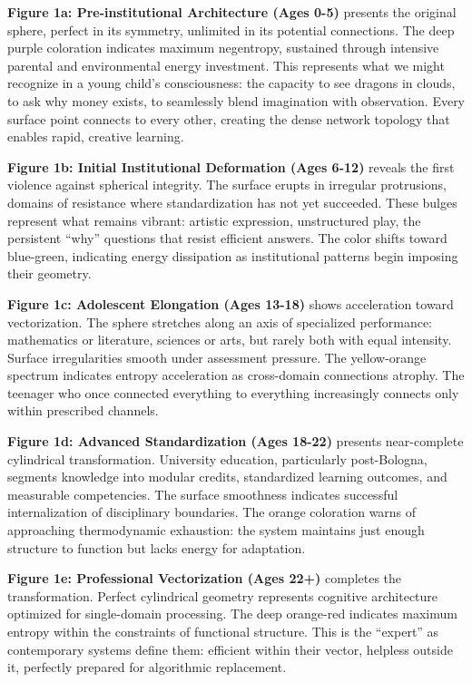 \textbf{Figure 1a: Pre-institutional Architecture (Ages 0-5)} presents the original sphere, perfect in its symmetry, unlimited in its potential connections. The deep purple coloration indicates maximum negentropy, sustained through intensive parental and environmental energy investment. This represents what we might recognize in a young child's consciousness: the capacity to see dragons in clouds, to ask why money exists, to seamlessly blend imagination with observation. Every surface point connects to every other, creating the dense network topology that enables rapid, creative learning.

\textbf{Figure 1b: Initial Institutional Deformation (Ages 6-12)} reveals the first violence against spherical integrity. The surface erupts in irregular protrusions, domains of resistance where standardization has not yet succeeded. These bulges represent what remains vibrant: artistic expression, unstructured play, the persistent ``why'' questions that resist efficient answers. The color shifts toward blue-green, indicating energy dissipation as institutional patterns begin imposing their geometry.

\textbf{Figure 1c: Adolescent Elongation (Ages 13-18)} shows acceleration toward vectorization. The sphere stretches along an axis of specialized performance: mathematics or literature, sciences or arts, but rarely both with equal intensity. Surface irregularities smooth under assessment pressure. The yellow-orange spectrum indicates entropy acceleration as cross-domain connections atrophy. The teenager who once connected everything to everything increasingly connects only within prescribed channels.

\textbf{Figure 1d: Advanced Standardization (Ages 18-22)} presents near-complete cylindrical transformation. University education, particularly post-Bologna, segments knowledge into modular credits, standardized learning outcomes, and measurable competencies. The surface smoothness indicates successful internalization of disciplinary boundaries. The orange coloration warns of approaching thermodynamic exhaustion: the system maintains just enough structure to function but lacks energy for adaptation.

\textbf{Figure 1e: Professional Vectorization (Ages 22+)} completes the transformation. Perfect cylindrical geometry represents cognitive architecture optimized for single-domain processing. The deep orange-red indicates maximum entropy within the constraints of functional structure. This is the ``expert'' as contemporary systems define them: efficient within their vector, helpless outside it, perfectly prepared for algorithmic replacement.

